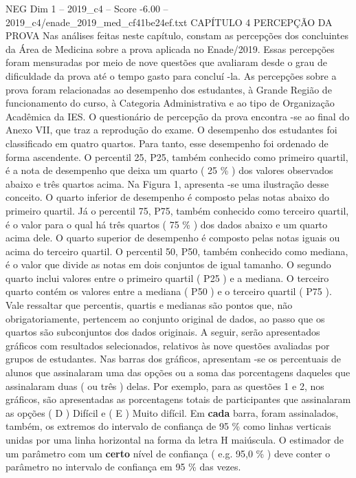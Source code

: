 \begin{textsample}{NEG Dim 1 – 2019\_c4 – Score -6.00 – 2019\_c4/enade\_2019\_med\_cf41be24ef.txt}  \label{ex:f1_neg_082}
CAPÍTULO 4 PERCEPÇÃO DA PROVA Nas análises feitas neste capítulo, constam as percepções dos concluintes da Área de Medicina sobre a prova aplicada no Enade/2019.
Essas percepções foram mensuradas por meio de nove questões que avaliaram desde o grau de dificuldade da prova até o tempo gasto para concluí -la.
As percepções sobre a prova foram relacionadas ao desempenho dos estudantes, à Grande Região de funcionamento do curso, à Categoria Administrativa e ao tipo de Organização Acadêmica da IES.
O questionário de percepção da prova encontra -se ao final do Anexo VII, que traz a reprodução do exame.
O desempenho dos estudantes foi classificado em quatro quartos.
Para tanto, esse desempenho foi ordenado de forma ascendente.
O percentil 25, P25, também conhecido como primeiro quartil, é a nota de desempenho que deixa um quarto ( 25 \% ) dos valores observados abaixo e três quartos acima.
Na Figura 1, apresenta -se uma ilustração desse conceito.
O quarto inferior de desempenho é composto pelas notas abaixo do primeiro quartil.
Já o percentil 75, P75, também conhecido como terceiro quartil, é o valor para o qual há três quartos ( 75 \% ) dos dados abaixo e um quarto acima dele.
O quarto superior de desempenho é composto pelas notas iguais ou acima do terceiro quartil.
O percentil 50, P50, também conhecido como mediana, é o valor que divide as notas em dois conjuntos de igual tamanho.
O segundo quarto inclui valores entre o primeiro quartil ( P25 ) e a mediana.
O terceiro quarto contém os valores entre a mediana ( P50 ) e o terceiro quartil ( P75 ).
Vale ressaltar que percentis, quartis e medianas são pontos que, não obrigatoriamente, pertencem ao conjunto original de dados, ao passo que os quartos são subconjuntos dos dados originais.
A seguir, serão apresentados gráficos com resultados selecionados, relativos às nove questões avaliadas por grupos de estudantes.
Nas barras dos gráficos, apresentam -se os percentuais de alunos que assinalaram uma das opções ou a soma das porcentagens daqueles que assinalaram duas ( ou três ) delas.
Por exemplo, para as questões 1 e 2, nos gráficos, são apresentadas as porcentagens totais de participantes que assinalaram as opções ( D ) Difícil e ( E ) Muito difícil.
Em \textbf{cada} barra, foram assinalados, também, os extremos do intervalo de confiança de 95 \% como linhas verticais unidas por uma linha horizontal na forma da letra H maiúscula.
O estimador de um parâmetro com um \textbf{certo} nível de confiança ( e.g. 95,0 \% ) deve conter o parâmetro no intervalo de confiança em 95 \% das vezes.

\end{textsample}
